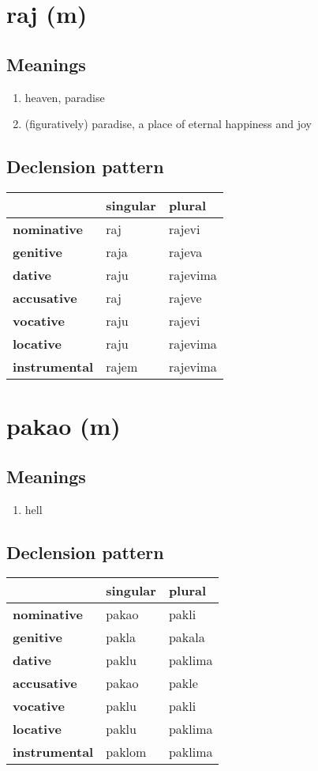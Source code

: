 \filbreak
\section{raj (m)}
\subsection*{Meanings}
\begin{enumerate}
\item heaven, paradise
\item (figuratively) paradise, a place of eternal happiness and joy
\end{enumerate}
\subsection*{Declension pattern}
\begin{tabularx}{\linewidth}{Xll}
\toprule
{} & singular &    plural \\
\midrule
\textbf{nominative  } &      raj &    rajevi \\
\textbf{genitive    } &     raja &    rajeva \\
\textbf{dative      } &     raju &  rajevima \\
\textbf{accusative  } &      raj &    rajeve \\
\textbf{vocative    } &     raju &    rajevi \\
\textbf{locative    } &     raju &  rajevima \\
\textbf{instrumental} &    rajem &  rajevima \\
\bottomrule
\end{tabularx}

\filbreak
\section{pakao (m)}
\subsection*{Meanings}
\begin{enumerate}
\item hell
\end{enumerate}
\subsection*{Declension pattern}
\begin{tabularx}{\linewidth}{Xll}
\toprule
{} & singular &   plural \\
\midrule
\textbf{nominative  } &    pakao &    pakli \\
\textbf{genitive    } &    pakla &   pakala \\
\textbf{dative      } &    paklu &  paklima \\
\textbf{accusative  } &    pakao &    pakle \\
\textbf{vocative    } &    paklu &    pakli \\
\textbf{locative    } &    paklu &  paklima \\
\textbf{instrumental} &   paklom &  paklima \\
\bottomrule
\end{tabularx}

